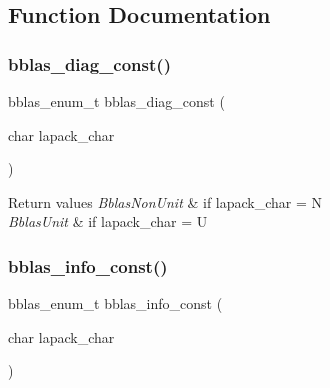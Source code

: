 \subsection{Function Documentation}
\mbox{\label{group__bblas__const_ga6169647caea1bc4ab77bcf161db8019e}} 
\subsubsection{\texorpdfstring{bblas\+\_\+diag\+\_\+const()}{bblas\_diag\_const()}}
{\footnotesize\ttfamily bblas\+\_\+enum\+\_\+t bblas\+\_\+diag\+\_\+const (\begin{DoxyParamCaption}\item[{char}]{lapack\+\_\+char }\end{DoxyParamCaption})}


\begin{DoxyRetVals}{Return values}
{\em Bblas\+Non\+Unit} & if lapack\+\_\+char = \textquotesingle{}N\textquotesingle{} \\
\hline
{\em Bblas\+Unit} & if lapack\+\_\+char = \textquotesingle{}U\textquotesingle{} \\
\hline
\end{DoxyRetVals}
\mbox{\label{group__bblas__const_gafdc80d2f9b5d3eb302d64147f1c44aa7}} 
\subsubsection{\texorpdfstring{bblas\+\_\+info\+\_\+const()}{bblas\_info\_const()}}
{\footnotesize\ttfamily bblas\+\_\+enum\+\_\+t bblas\+\_\+info\+\_\+const (\begin{DoxyParamCaption}\item[{char}]{lapack\+\_\+char }\end{DoxyParamCaption})}


